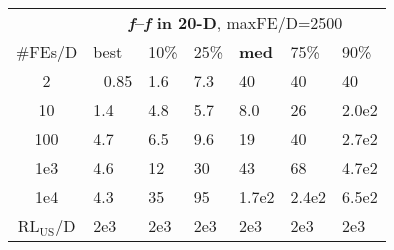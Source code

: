 \begin{tabular}{c|llllll}
 & \multicolumn{6}{|c}{\textbf{\textit{f}\raisebox{-0.35ex}{1}--\textit{f}\raisebox{-0.35ex}{24} in 20-D}, maxFE/D=2500}\\
\#FEs/D & best & 10\% & 25\% & \textbf{med} & 75\% & 90\%\\
2 & ~\,0.85 & \hspace*{1ex}1.6 & \hspace*{1ex}7.3 & 40 & 40 & 40\\
10 & \hspace*{1ex}1.4 & \hspace*{1ex}4.8 & \hspace*{1ex}5.7 & \hspace*{1ex}8.0 & 26 & 2.0e2\\
100 & \hspace*{1ex}4.7 & \hspace*{1ex}6.5 & \hspace*{1ex}9.6 & 19 & 40 & 2.7e2\\
1e3 & \hspace*{1ex}4.6 & 12 & 30 & 43 & 68 & 4.7e2\\
1e4 & \hspace*{1ex}4.3 & 35 & 95 & 1.7e2 & 2.4e2 & 6.5e2\\
$\text{RL}_{\text{US}}$/D & 2e3 & 2e3 & 2e3 & 2e3 & 2e3 & 2e3
\end{tabular}

